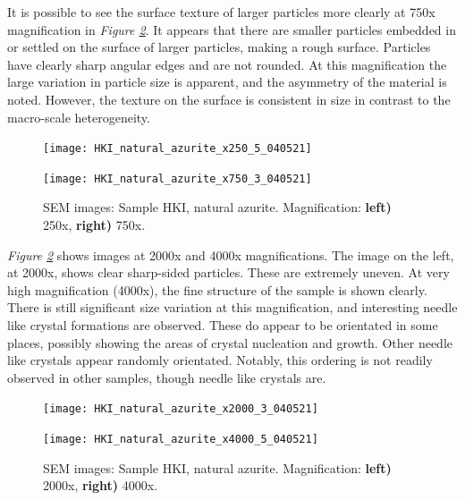 It is possible to see the surface texture of larger particles more clearly at 750x magnification in \textit{Figure \ref{fig:hki_nat_az_sem_2}}. It appears that there are smaller particles embedded in or settled on the surface of larger particles, making a rough surface. Particles have clearly sharp angular edges and are not rounded. At this magnification the large variation in particle size is apparent, and the asymmetry of the material is noted. However, the texture on the surface is consistent in size in contrast to the macro-scale heterogeneity.

\begin{figure}[H]
\centering
\begin{minipage}{.45\textwidth}
  \centering
  \texttt{[image: HKI\_natural\_azurite\_x250\_5\_040521]}
\end{minipage}
\begin{minipage}{.45\textwidth}
  \centering
  \texttt{[image: HKI\_natural\_azurite\_x750\_3\_040521]}
\end{minipage}
\caption[SEM images: Sample HKI, natural azurite]{SEM images: Sample HKI, natural azurite. Magnification: \textbf{left)} 250x, \textbf{right)} 750x.}
\label{fig:hki_nat_az_sem_1}
\end{figure}

\textit{Figure \ref{fig:hki_nat_az_sem_2}} shows images at 2000x and 4000x magnifications. The image on the left, at 2000x, shows clear sharp-sided particles. These are extremely uneven. At very high magnification (4000x), the fine structure of the sample is shown clearly. There is still significant size variation at this magnification, and interesting needle like crystal formations are observed. These do appear to be orientated in some places, possibly showing the areas of crystal nucleation and growth. Other needle like crystals appear randomly orientated. Notably, this ordering is not readily observed in other samples, though needle like crystals are.

\begin{figure}[H]
\centering
\begin{minipage}{.45\textwidth}
  \centering
  \texttt{[image: HKI\_natural\_azurite\_x2000\_3\_040521]}
\end{minipage}
\begin{minipage}{.45\textwidth}
  \centering
  \texttt{[image: HKI\_natural\_azurite\_x4000\_5\_040521]}
\end{minipage}
\caption[SEM images: Sample HKI, natural azurite]{SEM images: Sample HKI, natural azurite. Magnification: \textbf{left)} 2000x, \textbf{right)} 4000x.}
\label{fig:hki_nat_az_sem_2}
\end{figure}


